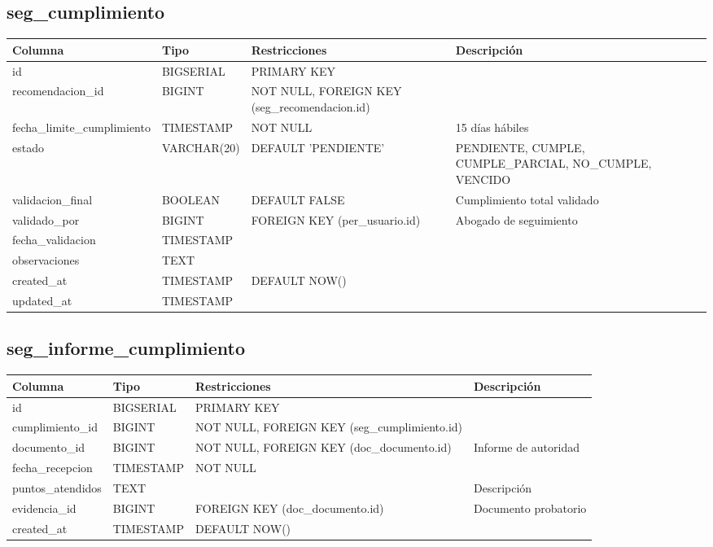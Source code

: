 \documentclass[12pt, a4paper]{article}
\begin{document}
\subsection{seg\_cumplimiento}
\begin{longtable}{|p{3.5cm}|p{2.5cm}|p{3cm}|p{5cm}|}
    \hline
    \rowcolor[gray]{0.9}
    \textbf{Columna} & \textbf{Tipo} & \textbf{Restricciones} & \textbf{Descripción} \\
    \hline
    id & BIGSERIAL & PRIMARY KEY & \\
    \hline
    recomendacion\_id & BIGINT & NOT NULL, FOREIGN KEY (seg\_recomendacion.id) & \\
    \hline
    fecha\_limite\_cumplimiento & TIMESTAMP & NOT NULL & 15 días hábiles \\
    \hline
    estado & VARCHAR(20) & DEFAULT 'PENDIENTE' & PENDIENTE, CUMPLE, CUMPLE\_PARCIAL, NO\_CUMPLE, VENCIDO \\
    \hline
    validacion\_final & BOOLEAN & DEFAULT FALSE & Cumplimiento total validado \\
    \hline
    validado\_por & BIGINT & FOREIGN KEY (per\_usuario.id) & Abogado de seguimiento \\
    \hline
    fecha\_validacion & TIMESTAMP & & \\
    \hline
    observaciones & TEXT & & \\
    \hline
    created\_at & TIMESTAMP & DEFAULT NOW() & \\
    \hline
    updated\_at & TIMESTAMP & & \\
    \hline
\end{longtable}

\subsection{seg\_informe\_cumplimiento}
\begin{longtable}{|p{3.5cm}|p{2.5cm}|p{3cm}|p{5cm}|}
    \hline
    \rowcolor[gray]{0.9}
    \textbf{Columna} & \textbf{Tipo} & \textbf{Restricciones} & \textbf{Descripción} \\
    \hline
    id & BIGSERIAL & PRIMARY KEY & \\
    \hline
    cumplimiento\_id & BIGINT & NOT NULL, FOREIGN KEY (seg\_cumplimiento.id) & \\
    \hline
    documento\_id & BIGINT & NOT NULL, FOREIGN KEY (doc\_documento.id) & Informe de autoridad \\
    \hline
    fecha\_recepcion & TIMESTAMP & NOT NULL & \\
    \hline
    puntos\_atendidos & TEXT & & Descripción \\
    \hline
    evidencia\_id & BIGINT & FOREIGN KEY (doc\_documento.id) & Documento probatorio \\
    \hline
    created\_at & TIMESTAMP & DEFAULT NOW() & \\
    \hline
\end{longtable}
\end{document}
